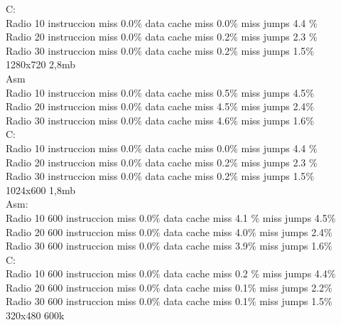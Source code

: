 C: \\
	Radio 10  instruccion miss  0.0$\%$  data cache miss 0.0$\%$ miss jumps  4.4 $\%$  \\
	Radio 20  instruccion miss  0.0$\%$  data cache miss 0.2$\%$ miss jumps   2.3 $\%$  \\
	Radio 30  instruccion miss  0.0$\%$  data cache miss 0.2$\%$ miss jumps   1.5$\%$  \\ 

1280x720 2,8mb \\

Asm \\
	Radio 10 instruccion miss   0.0$\%$  data cache miss  0.5$\%$ miss jumps   4.5$\%$ \\
	Radio 20 instruccion miss   0.0$\%$  data cache miss  4.5$\%$ miss jumps   2.4$\%$ \\	
	Radio 30 instruccion miss   0.0$\%$  data cache miss  4.6$\%$ miss jumps   1.6$\%$ \\

C: \\
	Radio 10 instruccion miss  0.0$\%$  data cache miss 0.0$\%$ miss jumps  4.4 $\%$  \\
	Radio 20 instruccion miss  0.0$\%$  data cache miss 0.2$\%$ miss jumps   2.3 $\%$  \\
	Radio 30 instruccion miss  0.0$\%$  data cache miss 0.2$\%$ miss jumps   1.5$\%$  \\ 

1024x600 1,8mb \\

Asm:\\ 
	Radio 10 600  	instruccion miss 0.0$\%$  data cache miss  4.1 $\%$ miss jumps  4.5$\%$  \\
	Radio 20 600  instruccion miss 0.0$\%$  data cache miss  4.0$\%$ miss jumps 2.4$\%$     \\
	Radio 30 600  	instruccion miss 0.0$\%$  data cache miss  3.9$\%$ miss jumps   1.6$\%$   \\

C: \\
	Radio 10 600  	instruccion miss  0.0$\%$ data cache miss 0.2 $\%$ miss jumps  4.4$\%$ \\
	Radio 20 600  	instruccion miss  0.0$\%$ data cache miss 0.1$\%$ miss jumps 2.2$\%$ \\
	Radio 30 600  	instruccion miss  0.0$\%$ data cache miss 0.1$\%$ miss jumps  1.5$\%$ \\

320x480 600k \\

